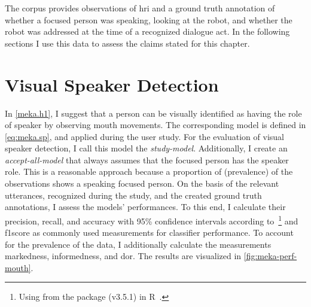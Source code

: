 
The corpus provides observations of \gls{hri} and a ground truth annotation of whether a focused person was speaking, looking at the \gls{robot}, and whether the \gls{robot} was addressed at the time of a recognized dialogue act.
In the following sections I use this data to assess the claims stated for this chapter.

\section{Visual Speaker Detection}\label{sec:meka.h1}

In \cref{meka.h1}, I suggest that a person can be visually identified as having the role of \gls{speaker} by observing mouth movements.
The corresponding model is defined in \cref{eq:meka.sp}, and applied during the user study.
For the evaluation of visual speaker detection, I call this model the \emph{study-model}.
Additionally, I create an \emph{accept-all-model} that always assumes that the focused person has the \gls{speaker} role.
This is a reasonable approach because a proportion of  (\gls{prevalence}) of the observations shows a speaking focused person.
On the basis of the relevant utterances, recognized during the study, and the created ground truth annotations, I assess the models' performances.
To this end, I calculate their \gls{precision}, \gls{recall}, and \gls{accuracy} with 95\% confidence intervals according to~\footnote{Using  from the  package (v3.5.1) in R~\cite{stats}.} and \gls{f1score} as commonly used measurements for classifier performance.
To account for the \gls{prevalence} of the data, I additionally calculate the measurements \gls{markedness}, \gls{informedness}, and \gls{dor}.
The results are visualized in \cref{fig:meka-perf-mouth}.

